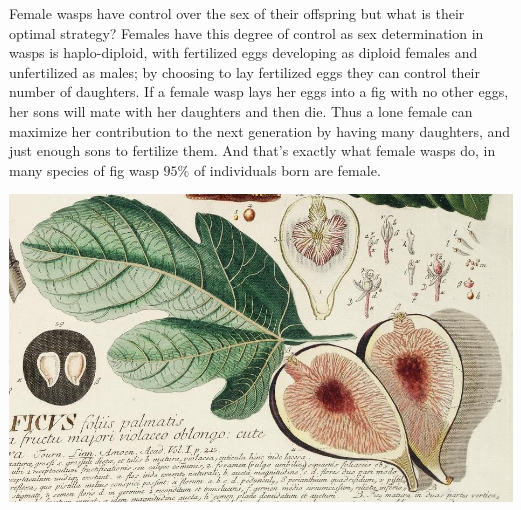 {Female wasps have control over the sex of their offspring but what is their optimal strategy? Females have
this degree of control as sex determination in wasps is haplo-diploid, with fertilized eggs
developing as diploid females and unfertilized as males; by choosing
to lay fertilized eggs they can control their number of daughters. 
If a female wasp lays her eggs into a fig with no other eggs, her sons
will mate with her daughters and then die. Thus a lone female can maximize
her contribution to the next generation by having many daughters, and
just enough sons to fertilize them. And that's exactly what female
wasps do, in many species of fig wasp $95\%$ of individuals born are
female.

\begin{marginfigure}
  \begin{center}
    \includegraphics[width=
    \textwidth]{illustration_images/single_locus_selection/Fig_wasp/cropped_fig.png}  %
\end{center}  %
\caption{ %
Common fig ({\it Ficus carica}). Despite urban legends the crunch in
figs isn't dead wasps, edible figs are dioecious and female wasps
can't lay in the female flowers that form the fruit we eat. 
} \label{fig:fig}
\end{marginfigure}

}
